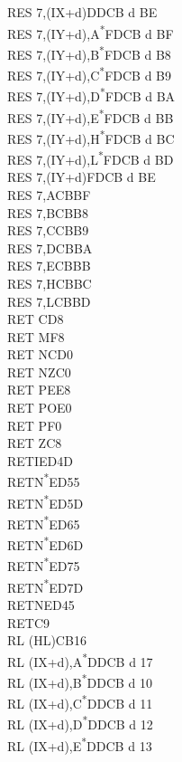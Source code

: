 \documentclass[oneside,a4paper]{book}
\begin{document}
\begin{multicols}{3}
{\begin{tabbing}
RES 7,(IX+d)\>DDCB d BE\\
RES 7,(IY+d),A\textsuperscript{*}\>FDCB d BF\\
RES 7,(IY+d),B\textsuperscript{*}\>FDCB d B8\\
RES 7,(IY+d),C\textsuperscript{*}\>FDCB d B9\\
RES 7,(IY+d),D\textsuperscript{*}\>FDCB d BA\\
RES 7,(IY+d),E\textsuperscript{*}\>FDCB d BB\\
RES 7,(IY+d),H\textsuperscript{*}\>FDCB d BC\\
RES 7,(IY+d),L\textsuperscript{*}\>FDCB d BD\\
RES 7,(IY+d)\>FDCB d BE\\
RES 7,A\>CBBF\\
RES 7,B\>CBB8\\
RES 7,C\>CBB9\\
RES 7,D\>CBBA\\
RES 7,E\>CBBB\\
RES 7,H\>CBBC\\
RES 7,L\>CBBD\\
RET C\>D8\\
RET M\>F8\\
RET NC\>D0\\
RET NZ\>C0\\
RET PE\>E8\\
RET PO\>E0\\
RET P\>F0\\
RET Z\>C8\\
RETI\>ED4D\\
RETN\textsuperscript{*}\>ED55\\
RETN\textsuperscript{*}\>ED5D\\
RETN\textsuperscript{*}\>ED65\\
RETN\textsuperscript{*}\>ED6D\\
RETN\textsuperscript{*}\>ED75\\
RETN\textsuperscript{*}\>ED7D\\
RETN\>ED45\\
RET\>C9\\
RL (HL)\>CB16\\
RL (IX+d),A\textsuperscript{*}\>DDCB d 17\\
RL (IX+d),B\textsuperscript{*}\>DDCB d 10\\
RL (IX+d),C\textsuperscript{*}\>DDCB d 11\\
RL (IX+d),D\textsuperscript{*}\>DDCB d 12\\
RL (IX+d),E\textsuperscript{*}\>DDCB d 13\\

\end{tabbing}}
\end{multicols}
\end{document}
